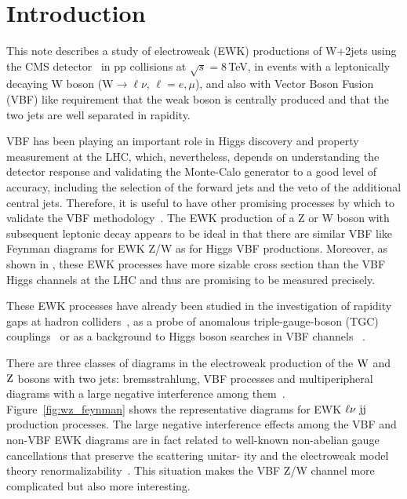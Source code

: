 \section{Introduction}

This note describes a study of electroweak (EWK) productions of W+2jets using the CMS detector~\cite{JINST} in pp collisions at $\sqrt{s}=8$\,TeV,  in events with a leptonically decaying W boson  (W$\to\ell\nu$, $\ell=e,\mu$), and also with Vector Boson Fusion (VBF) like requirement
that the weak boson is centrally produced and that the two jets are well separated in rapidity.

VBF has been playing an important role in Higgs discovery and property measurement at
the LHC, which, nevertheless, depends on understanding the detector response and validating the Monte-Calo generator to
a good level of accuracy, including the selection of the forward jets 
and the veto of the additional central jets. Therefore, it is useful to have other promising processes by which to
validate the VBF methodology~\cite{Green:2005zb,Govoni:2010bb}. The EWK production of a Z or W boson with subsequent leptonic
decay appears to be ideal in that there are similar VBF like Feynman diagrams for EWK Z/W as for Higgs
VBF productions. Moreover, as shown in \cite{Oleari:2003tc}, these EWK processes have more sizable cross section than the VBF Higgs channels at the LHC and thus are promising to be measured precisely.

These EWK processes have already been studied in the investigation of rapidity gaps at hadron
colliders~\cite{Rainwater:1996ud,Khoze:2002fa}, as a probe of anomalous triple-gauge-boson (TGC)
couplings~\cite{Baur:1993fv,Eboli:2004gc} or as a background to Higgs boson searches in VBF channels ~\cite{Rainwater:1998kj,Plehn:1999xi,Rainwater:1999sd,Kauer:2000hi}. 

There are three classes of diagrams in the electroweak production of the $\rm W$ and $\rm Z$ bosons with two
jets: bremsstrahlung, VBF processes and multiperipheral diagrams with a large
negative interference among them~\cite{Khoze:2002fa,Oleari:2003tc}.
Figure~\ref{fig:wz_feynman} shows the representative diagrams for EWK $\ell\nu~\rm jj$
production processes. The large negative interference effects among the VBF and non-VBF EWK diagrams
are in fact related to well-known non-abelian gauge cancellations that preserve the scattering unitar-
ity and the electroweak model theory renormalizability~\cite{'tHooft:1972fi}. This situation makes the VBF Z/W
channel more complicated but also more interesting.

